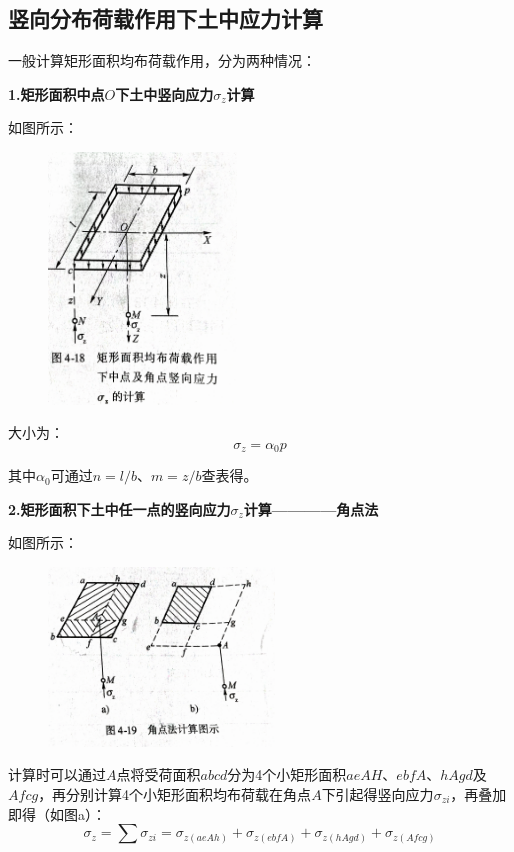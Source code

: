 \documentclass[12pt,a4paper]{ctexart}
\begin{document}
	\subsection{竖向分布荷载作用下土中应力计算}
	一般计算矩形面积均布荷载作用，分为两种情况：
	
	\noindent\textbf{1.矩形面积中点$O$下土中竖向应力$\sigma_z$计算}
	
	如图所示：
	\begin{figure}[H]
		\centering
		\includegraphics[width = 5cm ]{zd}
	\end{figure}
	
	大小为：
	\begin{equation}
		\sigma_z=\alpha_0p
	\end{equation}
	  
	其中$\alpha_0$可通过$n=l/b$、$m=z/b$查表得。
	
	\noindent\textbf{2.矩形面积下土中任一点的竖向应力$\sigma_z$计算————角点法}
	
	如图所示：
	\begin{figure}[H]
		\centering
		\includegraphics[width = 6cm ]{jdf}
	\end{figure}
	
	计算时可以通过$A$点将受荷面积$abcd$分为4个小矩形面积$aeAH$、$ebfA$、$hAgd$及$Afcg$，再分别计算4个小矩形面积均布荷载在角点$A$下引起得竖向应力$\sigma_{zi}$，再叠加即得（如图a）：
	\begin{equation}
		\sigma_z=\sum\sigma_{zi}=\sigma_{z(aeAh)}+\sigma_{z(ebfA)}+\sigma_{z(hAgd)}+\sigma_{z(Afcg)}
	\end{equation}
\end{document}
